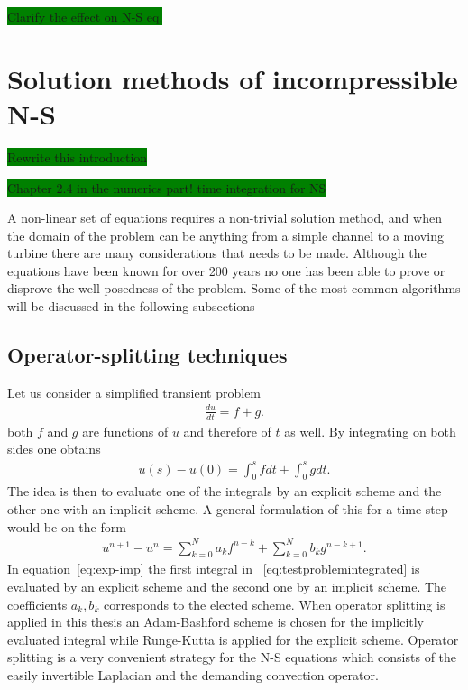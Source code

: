 \colorbox{green}{Clarify the effect on N-S eq.}

\section{Solution methods of incompressible N-S}
\colorbox{green}{Rewrite this introduction}

\colorbox{green}{Chapter 2.4 in the numerics part! time integration for NS}


A non-linear set of equations requires a non-trivial solution method, and when the domain of the problem can be anything from a simple channel 
to a moving turbine there are many considerations that needs to be made. Although the equations have been known for over 200 years no one 
has been able to prove or disprove the well-posedness of the problem. Some of the most common algorithms 
will be discussed in the following subsections

\subsection{Operator-splitting techniques }
Let us consider a simplified transient problem 
\begin{align}
    \frac{du}{dt} = f + g.
    \label{eq:testproblem}
\end{align}
both $f$ and $g$ are functions of $u$ and therefore of $t$ as well. By integrating on both sides one obtains
\begin{align}
    u(s) - u(0) = \int_0^s f dt + \int_0^s g dt.
    \label{eq:testproblemintegrated}
\end{align}
The idea is then to evaluate one of the integrals by an explicit scheme and the other one with an implicit scheme.
A general formulation of this for a time step would be on the form 
\begin{align}
    u^{n+1}-u^{n} = \sum_{k = 0}^{N} a_k f^{n-k}+\sum_{k = 0}^{N} b_k g^{n-k+1}.
    \label{eq:exp-imp}
\end{align}
In equation~\ref{eq:exp-imp} the first integral in ~\ref{eq:testproblemintegrated} is evaluated by 
an explicit scheme and the second one by an implicit scheme. The coefficients $a_k,b_k$ corresponds to 
the elected scheme. When operator splitting is applied in this thesis an Adam-Bashford scheme is 
chosen for the implicitly evaluated integral while Runge-Kutta is applied for the explicit scheme. 
Operator splitting is a very convenient strategy for 
the N-S equations which consists of the easily invertible Laplacian
and the demanding convection operator. 

